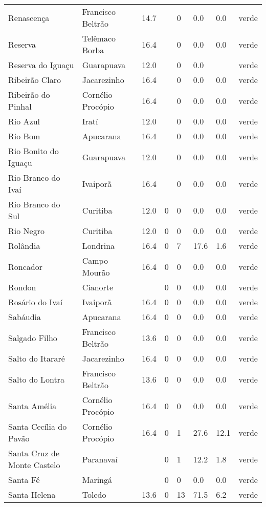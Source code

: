 \begin{longtable}{l|lllllll}
  Renascença & Francisco Beltrão & 14.7 &  & 0 & 0.0 & 0.0 & verde \\ 
  Reserva & Telêmaco Borba & 16.4 &  & 0 & 0.0 & 0.0 & verde \\ 
  Reserva do Iguaçu & Guarapuava & 12.0 &  & 0 & 0.0 &  & verde \\ 
  Ribeirão Claro & Jacarezinho & 16.4 &  & 0 & 0.0 & 0.0 & verde \\ 
  Ribeirão do Pinhal & Cornélio Procópio & 16.4 &  & 0 & 0.0 & 0.0 & verde \\ 
  Rio Azul & Iratí & 12.0 &  & 0 & 0.0 & 0.0 & verde \\ 
  Rio Bom & Apucarana & 16.4 &  & 0 & 0.0 & 0.0 & verde \\ 
  Rio Bonito do Iguaçu & Guarapuava & 12.0 &  & 0 & 0.0 & 0.0 & verde \\ 
  Rio Branco do Ivaí & Ivaiporã & 16.4 &  & 0 & 0.0 & 0.0 & verde \\ 
  Rio Branco do Sul & Curitiba & 12.0 & 0 & 0 & 0.0 & 0.0 & verde \\ 
  Rio Negro & Curitiba & 12.0 & 0 & 0 & 0.0 & 0.0 & verde \\ 
  Rolândia & Londrina & 16.4 & 0 & 7 & 17.6 & 1.6 & verde \\ 
  Roncador & Campo Mourão & 16.4 & 0 & 0 & 0.0 & 0.0 & verde \\ 
  Rondon & Cianorte &  & 0 & 0 & 0.0 & 0.0 & verde \\ 
  Rosário do Ivaí & Ivaiporã & 16.4 & 0 & 0 & 0.0 & 0.0 & verde \\ 
  Sabáudia & Apucarana & 16.4 & 0 & 0 & 0.0 & 0.0 & verde \\ 
  Salgado Filho & Francisco Beltrão & 13.6 & 0 & 0 & 0.0 & 0.0 & verde \\ 
  Salto do Itararé & Jacarezinho & 16.4 & 0 & 0 & 0.0 & 0.0 & verde \\ 
  Salto do Lontra & Francisco Beltrão & 13.6 & 0 & 0 & 0.0 & 0.0 & verde \\ 
  Santa Amélia & Cornélio Procópio & 16.4 & 0 & 0 & 0.0 & 0.0 & verde \\ 
  Santa Cecília do Pavão & Cornélio Procópio & 16.4 & 0 & 1 & 27.6 & 12.1 & verde \\ 
  Santa Cruz de Monte Castelo & Paranavaí &  & 0 & 1 & 12.2 & 1.8 & verde \\ 
  Santa Fé & Maringá &  & 0 & 0 & 0.0 & 0.0 & verde \\ 
  Santa Helena & Toledo & 13.6 & 0 & 13 & 71.5 & 6.2 & verde \\ 

\end{longtable}
